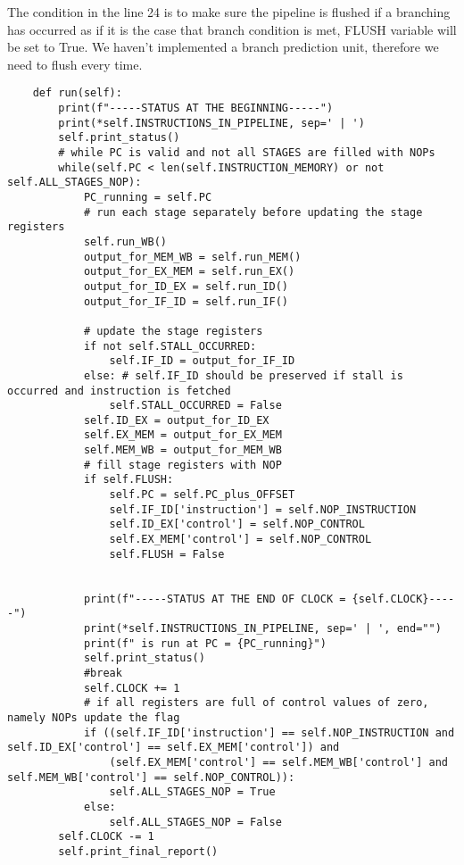 \noindent The condition in the line 24 is to make sure the pipeline is flushed if a branching has occurred as if it is the case that branch condition is met, FLUSH variable will be set to True. We haven't implemented a branch prediction unit, therefore we need to flush every time. 
\vspace{0.5 cm}
\begin{lstlisting}
    def run(self):
        print(f"-----STATUS AT THE BEGINNING-----")
        print(*self.INSTRUCTIONS_IN_PIPELINE, sep=' | ')
        self.print_status()
        # while PC is valid and not all STAGES are filled with NOPs
        while(self.PC < len(self.INSTRUCTION_MEMORY) or not self.ALL_STAGES_NOP):
            PC_running = self.PC
            # run each stage separately before updating the stage registers
            self.run_WB()
            output_for_MEM_WB = self.run_MEM()
            output_for_EX_MEM = self.run_EX()
            output_for_ID_EX = self.run_ID()
            output_for_IF_ID = self.run_IF()

            # update the stage registers
            if not self.STALL_OCCURRED:
                self.IF_ID = output_for_IF_ID
            else: # self.IF_ID should be preserved if stall is occurred and instruction is fetched
                self.STALL_OCCURRED = False
            self.ID_EX = output_for_ID_EX
            self.EX_MEM = output_for_EX_MEM
            self.MEM_WB = output_for_MEM_WB
            # fill stage registers with NOP
            if self.FLUSH:
                self.PC = self.PC_plus_OFFSET
                self.IF_ID['instruction'] = self.NOP_INSTRUCTION
                self.ID_EX['control'] = self.NOP_CONTROL
                self.EX_MEM['control'] = self.NOP_CONTROL
                self.FLUSH = False


            print(f"-----STATUS AT THE END OF CLOCK = {self.CLOCK}-----")
            print(*self.INSTRUCTIONS_IN_PIPELINE, sep=' | ', end="")
            print(f" is run at PC = {PC_running}")
            self.print_status()
            #break
            self.CLOCK += 1
            # if all registers are full of control values of zero, namely NOPs update the flag
            if ((self.IF_ID['instruction'] == self.NOP_INSTRUCTION and self.ID_EX['control'] == self.EX_MEM['control']) and
                (self.EX_MEM['control'] == self.MEM_WB['control'] and self.MEM_WB['control'] == self.NOP_CONTROL)):
                self.ALL_STAGES_NOP = True
            else:
                self.ALL_STAGES_NOP = False
        self.CLOCK -= 1
        self.print_final_report()
\end{lstlisting}
